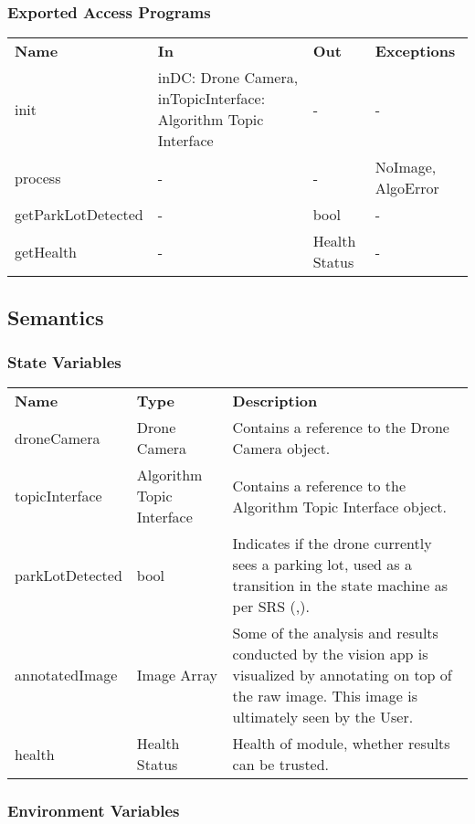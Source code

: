 \documentclass[12pt, titlepage]{article}
\begin{document}
\subsubsection{Exported Access Programs}
\begin{center}
\begin{tabular}{p{3.5cm} p{5cm} p{2.5cm} p{2.5cm}}
\hline
\textbf{Name} & \textbf{In} & \textbf{Out} & \textbf{Exceptions} \\
init & inDC: Drone Camera, inTopicInterface: Algorithm Topic Interface & - & - \\
process & - & - & NoImage, AlgoError \\
getParkLotDetected & - & bool & - \\
getHealth & - & Health Status & - \\
\hline
\hline
\end{tabular}
\end{center}
\subsection{Semantics}
\subsubsection{State Variables}
\begin{center}
\begin{tabular}{p{3 cm} p{4cm} p{5cm} }
\hline
\textbf{Name} & \textbf{Type} & \textbf{Description}  \\
droneCamera & Drone Camera & Contains a reference to the Drone Camera object. \\
topicInterface & Algorithm Topic Interface & Contains a reference to the Algorithm Topic Interface object.\\
parkLotDetected & bool & Indicates if the drone currently sees a parking lot, used as a transition in the state machine as per SRS (\nameref{TRANS_007},\nameref{TRANS_008}). \\
annotatedImage & Image Array & Some of the analysis and results conducted by the vision app is visualized by annotating on top of the raw image. This image is ultimately seen by the User.   \\
health & Health Status & Health of module, whether results can be trusted.   \\
\hline
\hline
\end{tabular}
\end{center}
\subsubsection{Environment Variables}
\end{document}
